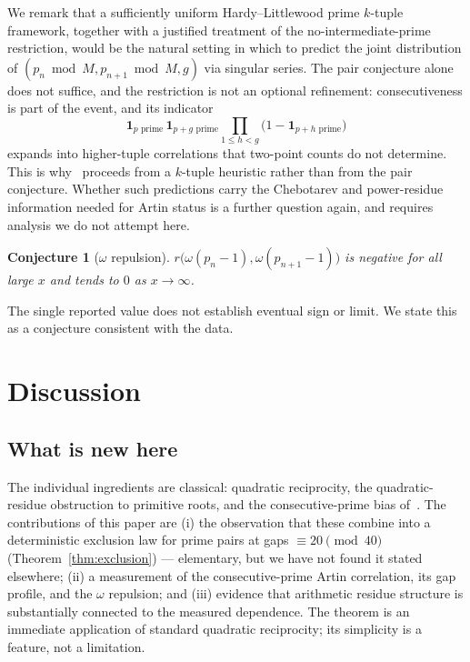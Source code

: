 \documentclass[11pt]{amsart}
\newtheorem{conjecture}{Conjecture}
\theoremstyle{definition}
\begin{document}
We remark that a sufficiently uniform Hardy--Littlewood prime $k$-tuple
framework, together with a justified treatment of the no-intermediate-prime
restriction, would be the natural setting in which to predict the joint
distribution of $(p_n \bmod M, p_{n+1} \bmod M, g)$ via singular series. The
pair conjecture alone does not suffice, and the restriction is not an optional
refinement: consecutiveness is part of the event, and its indicator
\[
  \mathbf{1}_{p \text{ prime}} \, \mathbf{1}_{p+g \text{ prime}}
  \prod_{1 \le h < g} \bigl(1 - \mathbf{1}_{p+h \text{ prime}}\bigr)
\]
expands into higher-tuple correlations that two-point counts do not determine.
This is why~\cite{LOS2016} proceeds from a $k$-tuple heuristic rather than from
the pair conjecture. Whether such predictions carry the Chebotarev and
power-residue information needed for Artin status is a further question again,
and requires analysis we do not attempt here.

\begin{conjecture}[$\omega$ repulsion]
	\label{conj:omega}
	$r\bigl(\omega(p_n-1), \omega(p_{n+1}-1)\bigr)$ is negative for all large $x$
	and tends to $0$ as $x \to \infty$.
\end{conjecture}

The single reported value does not establish eventual sign or limit. We state
this as a conjecture consistent with the data.

\section{Discussion}
\label{sec:discussion}

\subsection*{What is new here}
The individual ingredients are classical: quadratic reciprocity, the
quadratic-residue obstruction to primitive roots, and the consecutive-prime bias
of~\cite{LOS2016}. The contributions of this paper are (i) the observation
that these combine into a deterministic exclusion law for prime pairs at gaps
$\equiv 20 \pmod{40}$ (Theorem~\ref{thm:exclusion}) --- elementary, but we have
not found it stated elsewhere; (ii) a measurement of the
consecutive-prime Artin correlation, its gap profile, and the $\omega$
repulsion; and (iii) evidence that arithmetic residue structure is substantially
connected to the measured dependence. The theorem is an immediate
application of standard quadratic reciprocity; its simplicity is a feature,
not a limitation.
\end{document}
